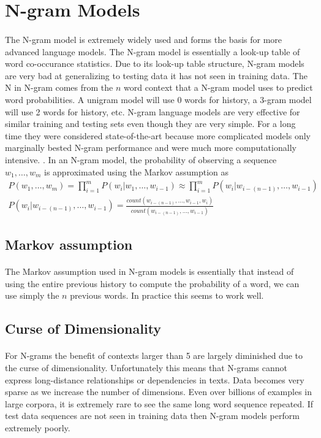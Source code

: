 \section{N-gram Models}
\paragraph{}
The N-gram model is extremely widely used and forms the basis for more advanced language models. The N-gram model is essentially a look-up table of word co-occurance statistics. Due to its look-up table structure, N-gram models are very bad at generalizing to testing data it has not seen in training data. The N in N-gram comes from the $n$ word context that a N-gram model uses to predict word probabilities. A unigram model will use 0 words for history, a 3-gram model will use 2 words for history, etc. N-gram language models are very effective for similar training and testing sets even though they are very simple. For a long time they were considered state-of-the-art because more complicated models only marginally bested N-gram performance and were much more computationally intensive. \cite{Mikolav2012}. 
In an N-gram model, the probability of observing a sequence $w_1, \dots, w_m$ is approximated using the Markov assumption as 
\begin{align}
P(w_1,\dots,w_m) = \prod^{m}_{i=1} P(w_i|w_1,\dots, w_{i-1}) \approx  \prod^{m}_{i=1} P(w_i | w_{i-(n-1)},\dots, w_{i-1}) 
\\P(w_i | w_{i-(n-1)},\dots, w_{i-1}) = \frac{count(w_{i-(n-1)},\dots,w_{i-1},w_i)}{count(w_{i-(n-1)},\dots,w_{i-1})}
\end{align}
\subsection{Markov assumption}
\paragraph{}
The Markov assumption used in N-gram models is essentially that instead of using the entire previous history to compute the probability of a word, we can use simply the $n$ previous words. In practice this seems to work well.
\subsection{Curse of Dimensionality}
\paragraph{}
For N-grams the benefit of contexts larger than 5 are largely diminished due to the curse of dimensionality. Unfortunately this means that N-grams cannot express long-distance relationships or dependencies in texts. Data becomes very sparse as we increase the number of dimensions. Even over billions of examples in large corpora, it is extremely rare to see the same long word sequence repeated. If test data sequences are not seen in training data then N-gram models perform extremely poorly. 
